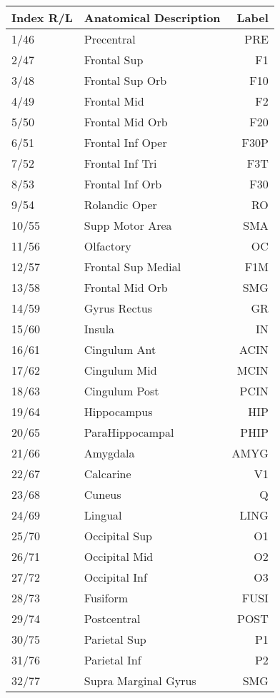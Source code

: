 \begin{table}[htbp]
\begin{center}
\begin{tabular}{ l | l | r }
  
  Index R/L & Anatomical Description & Label \\
  \hline  \hline                     
  1/46 & Precentral & PRE   \\ 
  2/47 & Frontal Sup & F1 \\
3/48 & Frontal Sup Orb    &      F10 \\
4/49 & Frontal Mid        &       F2\\
5/50 & Frontal Mid Orb    &      F20\\
6/51 & Frontal Inf Oper   &    F30P\\
7/52 & Frontal Inf Tri    &     F3T\\
8/53 & Frontal Inf Orb    &      F30\\
9/54 & Rolandic Oper      &      RO\\
10/55 & Supp Motor Area  &      SMA\\
11/56 & Olfactory          &      OC\\
12/57 & Frontal Sup Medial  &   F1M\\
13/58 & Frontal Mid Orb     &   SMG\\
14/59 & Gyrus Rectus         &    GR\\
15/60 & Insula              &      IN\\
16/61 & Cingulum Ant       &   ACIN\\
17/62 & Cingulum Mid        &  MCIN\\
18/63 & Cingulum Post        & PCIN\\
19/64 & Hippocampus         &    HIP\\
20/65 & ParaHippocampal     &  PHIP\\
21/66 & Amygdala           &  AMYG\\
22/67 & Calcarine          &       V1\\
23/68 & Cuneus             &        Q\\
24/69 & Lingual            &   LING\\
25/70 & Occipital Sup      &       O1\\
26/71 & Occipital Mid      &       O2\\
27/72 & Occipital Inf      &       O3\\
28/73 & Fusiform           &    FUSI\\
29/74 & Postcentral        &   POST\\
30/75 & Parietal Sup       &       P1\\
31/76 & Parietal Inf       &       P2\\
32/77 & Supra Marginal Gyrus  &  SMG\\

\end{tabular}
\end{center}
\end{table}
